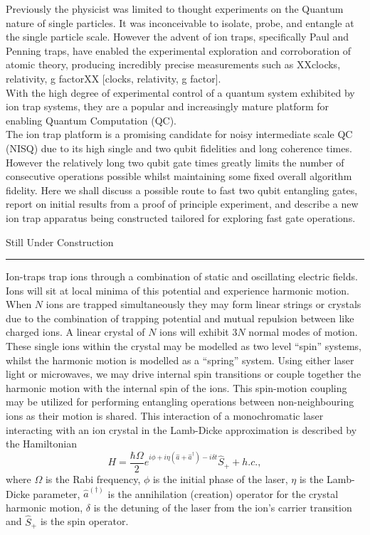 \documentclass[12pt]{iopart}
\begin{document}
Previously the physicist was limited to thought experiments on the
Quantum nature of single particles. It was inconceivable to isolate,
probe, and entangle at the single particle scale. However the advent of
ion traps, specifically Paul and Penning traps, have enabled the
experimental exploration and corroboration of atomic theory, producing
incredibly precise measurements such as XXclocks, relativity, g
factorXX [clocks, relativity, g factor].\\ With the high degree of
experimental control of a quantum system exhibited by ion trap
systems, they are a popular and increasingly mature platform for
enabling Quantum Computation (QC).\\
The ion trap platform is a promising candidate for noisy intermediate
scale QC (NISQ) due to its high single and two qubit
fidelities and long coherence times. However the relatively long two
qubit gate times greatly limits the number of consecutive operations
possible whilst maintaining some fixed overall algorithm
fidelity. Here we shall discuss a possible route to fast two qubit
entangling gates, report on initial results from a proof of principle
experiment, and describe a new ion trap apparatus being constructed
tailored for exploring fast gate operations.\\

\begin{center}
Still Under Construction \\
\end{center}
\hrule\vspace{1em}
Ion-traps trap ions through a combination of static and oscillating
electric fields. Ions will sit at local minima of this potential and
experience harmonic motion. When $N$ ions are trapped simultaneously
they may form linear strings or crystals due to the combination of
trapping potential and mutual repulsion between like charged ions. A
linear crystal of $N$ ions will exhibit $3N$ normal modes of
motion. These single ions within the crystal may be modelled as two
level ``spin'' systems, whilst the harmonic motion is modelled as a
``spring'' system. Using either laser light or microwaves, we may
drive internal spin transitions or couple together the harmonic motion
with the internal spin of the ions.  This spin-motion coupling may be
utilized for performing entangling operations between non-neighbouring
ions as their motion is shared. This interaction of a monochromatic
laser interacting with an ion crystal in the Lamb-Dicke approximation
is described by the Hamiltonian
$$H = \frac{\hbar \Omega}{2} e^{i\phi + i\eta(\hat{a} + \hat{a}^\dag) - i\delta t}\hat{S}_+ + h.c.,$$
where $\Omega$ is the Rabi frequency, $\phi$ is the initial phase of
the laser, $\eta$ is the Lamb-Dicke parameter, $\hat{a}^{(\dag)}$ is
the annihilation (creation) operator for the crystal harmonic motion,
$\delta$ is the detuning of the laser from the ion's carrier
transition and $\hat{S}_+$ is the spin operator.\\
\end{document}

